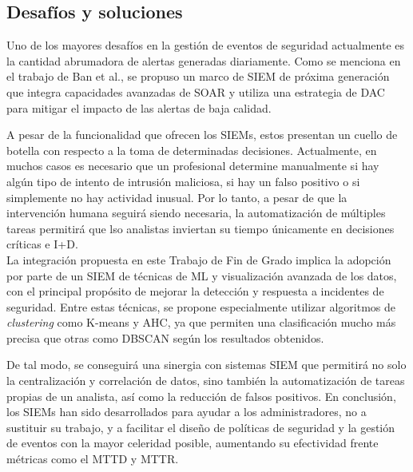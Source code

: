 
\vspace{-2mm}

\subsection{Desafíos y soluciones}

Uno de los mayores desafíos en la gestión de eventos de seguridad actualmente es la cantidad abrumadora de alertas generadas diariamente. Como se menciona en el trabajo de Ban et al.\cite{bantao2023}, se propuso un marco de \gls{SIEM} de próxima generación que integra capacidades avanzadas de \gls{SOAR} y utiliza una estrategia de \gls{DAC} para mitigar el impacto de las alertas de baja calidad.

A pesar de la funcionalidad que ofrecen los \gls{SIEM}s, estos presentan un cuello de botella con respecto a la toma de determinadas decisiones. Actualmente, en muchos casos es necesario que un profesional determine manualmente si hay algún tipo de intento de intrusión maliciosa, si hay un falso positivo o si simplemente no hay actividad inusual. Por lo tanto, a pesar de que la intervención humana seguirá siendo necesaria, la automatización de múltiples tareas permitirá que lso analistas inviertan su tiempo únicamente en decisiones críticas e \gls{I+D}. \\

La integración propuesta en este Trabajo de Fin de Grado implica la adopción por parte de un \gls{SIEM} de técnicas de \gls{ML} y visualización avanzada de los datos, con el principal propósito de mejorar la detección y respuesta a incidentes de seguridad. Entre estas técnicas, se propone especialmente utilizar algoritmos de \textit{clustering} como K-means y \gls{AHC}, ya que permiten una clasificación mucho más precisa que otras como \gls{DBSCAN} según los resultados obtenidos.

De tal modo, se conseguirá una sinergia con sistemas \gls{SIEM} que permitirá no solo la centralización y correlación de datos, sino también la automatización de tareas propias de un analista, así como la reducción de falsos positivos. En conclusión, los \gls{SIEM}s han sido desarrollados para ayudar a los administradores, no a sustituir su trabajo, y a facilitar el diseño de políticas de seguridad y la gestión de eventos con la mayor celeridad posible, aumentando su efectividad frente métricas como el \gls{MTTD} y \gls{MTTR}.

